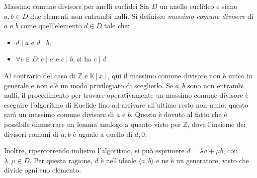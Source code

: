 \documentclass[11pt, a4paper]{scrartcl}
\theoremstyle{definition}
\numberwithin{esempio}{section}
\theoremstyle{definition}
\numberwithin{obs}{section}
\numberwithin{nota}{section}
\numberwithin{equation}{subsection}
\begin{document}
\begin{definizione}
	{Massimo comune divisore per anelli euclidei}{}
	Sia $D$ un anello euclideo e siano $a,b \in D$ due elementi non entrambi nulli.
	Si definisce \textit{massimo comune divisore} di $a$ e $b$ come quell'elemento $d \in D$ tale che:
	\begin{itemize}
		\item $d  \mid a $ e $d \mid b$;
		\item $\forall c \in D : c  \mid a$ e $c  \mid b$, si ha $c  \mid d$.
	\end{itemize}
\end{definizione}
\noindent Al contrario del caso di $\mathbb{Z}$ e $\mathbb{K}[x]$, qui il massimo comune divisore non \`e unico  in generale e non c'\`e un modo privilegiato di sceglierlo. 
Se $a,b$ sono non entrambi nulli, il procedimento per trovare operativamente un massimo comune divisore \`e eseguire l'algoritmo di Euclide fino ad arrivare all'ultimo resto non-nullo: questo sar\`a un massimo comune divisore di $a$ e $b$.
Questo \`e dovuto al fatto che \`e possibile dimostrare un lemma analogo a quanto visto per $\mathbb{Z}$, dove l'insieme dei divisori comuni di $a,b$ \`e uguale a quello di $d,0$.

Inoltre, ripercorrendo indietro l'algoritmo, si pu\`o esprimere $d = \lambda a + \mu b$, con $\lambda ,\mu \in D$.
Per questa ragione, $d$ \`e nell'ideale $\langle a,b \rangle$ e ne \`e un generatore, visto che divide ogni suo elemento.
\end{document}
